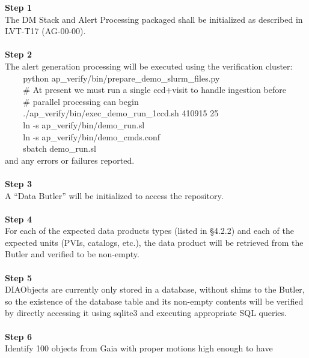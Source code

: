 \textbf{Step 1}\\
The DM Stack and Alert Processing packaged shall be initialized as
described in LVT-T17 (AG-00-00).\\
~\\
\textbf{Step 2}\\
The alert generation processing will be executed using the verification
cluster:\\
\hspace*{0.333em} ~ ~ ~python
ap\_verify/bin/prepare\_demo\_slurm\_files.py\\
\hspace*{0.333em} ~ ~ ~\# At present we must run a single ccd+visit to
handle ingestion before\\
\hspace*{0.333em} ~ ~ ~\# parallel processing can begin\\
\hspace*{0.333em} ~ ~ ~./ap\_verify/bin/exec\_demo\_run\_1ccd.sh 410915
25\\
\hspace*{0.333em} ~ ~ ~ln -s ap\_verify/bin/demo\_run.sl\\
\hspace*{0.333em} ~ ~ ~ln -s ap\_verify/bin/demo\_cmds.conf\\
\hspace*{0.333em} ~ ~ ~sbatch demo\_run.sl\\
and any errors or failures reported.\\
~\\
\textbf{Step 3}\\
A ``Data Butler'' will be initialized to access the repository.\\
~\\
\textbf{Step 4}\\
For each of the expected data products types (listed in §4.2.2) and each
of the expected units (PVIs, catalogs, etc.), the data product will be
retrieved from the Butler and verified to be non-empty.\\
~\\
\textbf{Step 5}\\
DIAObjects are currently only stored in a database, without shims to the
Butler, so the existence of the database table and its non-empty
contents will be verified by directly accessing it using sqlite3 and
executing appropriate SQL queries.\\
~\\
\textbf{Step 6}\\
Identify 100 objects from Gaia with proper motions high enough to have
